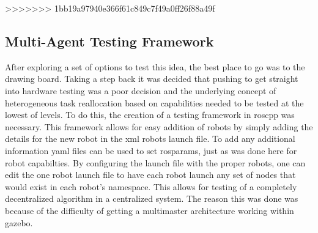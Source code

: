 %
>>>>>>> 1bb19a97940e366f61c849c7f49a0ff26f88a49f


\subsection{Multi-Agent Testing Framework}

After exploring a set of options to test this idea, the best place to go was to the drawing
board. Taking a step back it was decided that pushing to get straight into hardware testing
was a poor decision and the underlying concept of heterogeneous task reallocation based on
capabilities needed to be tested at the lowest of levels. To do this, the creation of a testing
framework in roscpp was necessary. This framework allows for easy addition of robots by simply
adding the details for the new robot in the xml robots launch file. To add any additional information
yaml files can be used to set rosparams, just as was done here for robot capabilties. By configuring
the launch file with the proper robots, one can edit the one robot launch file to have each robot launch
any set of nodes that would exist in each robot's namespace. This allows for testing of a completely
decentralized algorithm in a centralized system. The reason this was done was because of the difficulty
of getting a multimaster architecture working within gazebo.
